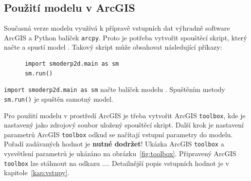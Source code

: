 \subsection{Použití modelu v ArcGIS}
  
  Současná verze modelu \smod využívá k přípravě vstupních dat výhradně software ArcGIS a Python balíček {\tt arcpy}. Proto je potřeba vytvořit spouštěcí skript, který načte a spustí model \smod. Takový skript může obsahovat následující příkazy:
    \begin{lstlisting}
      import smoderp2d.main as sm
      sm.run()
    \end{lstlisting}
  {\tt import smoderp2d.main as sm}  načte balíček modelu \smod. Spuštěním metody  {\tt sm.run()} je spuštěn samotný model. 
  
  Pro použití modelu v prostředí ArcGIS je třeba vytvořit ArcGIS {\tt toolbox}, kde je nastavený jako zdrojový soubor  uložený spouštěcí skript. Další krok je nastavení parametrů ArcGIS {\tt toolbox} odkud se načítají vstupní parametry do modelu. Pořadí zadávaných hodnot je {\bf nutné dodržet}! Ukázka ArcGIS {\tt toolbox} a vysvětlení parametrů je ukázáno na obrázku~\ref{fig:toolbox}. Připravený ArcGIS {\tt toolbox} lze stáhnout na odkazu .... Detailnější popis vstupních hodnot je v kapitole~\ref{kap:vstupy}.
  
  
  
